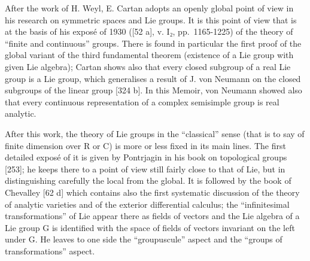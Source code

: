 After the work of H. Weyl, E. Cartan adopts an openly global point of view in his research on symmetric spaces and Lie groups. It is this point of view that is at the basis of his exposé of 1930 ({[}52 a{]}, v. I₂, pp.~1165-1225) of the theory of ``finite and continuous'' groups. There is found in particular the first proof of the global variant of the third fundamental theorem (existence of a Lie group with given Lie algebra); Cartan shows also that every closed subgroup of a real Lie group is a Lie group, which generalises a result of J. von Neumann on the closed subgroups of the linear group {[}324 b{]}. In this Memoir, von Neumann showed also that every continuous representation of a complex semisimple group is real analytic.

After this work, the theory of Lie groups in the ``classical'' sense (that is to say of finite dimension over R or C) is more or less fixed in its main lines. The first detailed exposé of it is given by Pontrjagin in his book on topological groups {[}253{]}; he keeps there to a point of view still fairly close to that of Lie, but in distinguishing carefully the local from the global. It is followed by the book of Chevalley {[}62 d{]} which contains also the first systematic discussion of the theory of analytic varieties and of the exterior differential calculus; the ``infinitesimal transformations'' of Lie appear there as fields of vectors and the Lie algebra of a Lie group G is identified with the space of fields of vectors invariant on the left under G. He leaves to one side the ``groupuscule'' aspect and the ``groups of transformations'' aspect.

